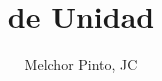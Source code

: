 \documentclass[examen,answers]{RDS_unit}
\title{de Unidad}
\author{Melchor Pinto, JC}
\begin{document}
\begin{questions}

\end{questions}
\end{document}
